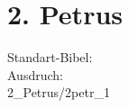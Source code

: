 \section{2. Petrus}
        Standart-Bibel: \getdefault \\
        Ausdruch: \getversions \\        
         {2_Petrus/2petr_1} 
